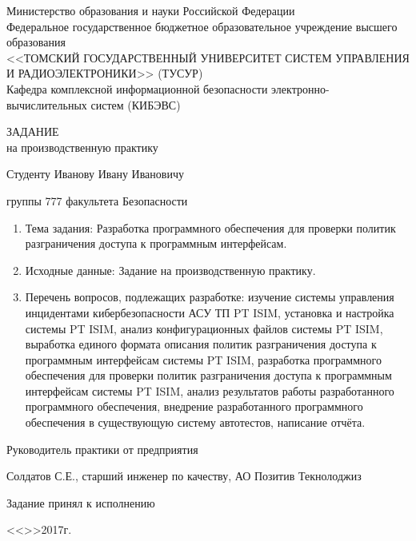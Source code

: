 \begin{center}
 Министерство образования и науки Российской Федерации\\
 Федеральное государственное бюджетное образовательное учреждение высшего образования\\
 <<ТОМСКИЙ ГОСУДАРСТВЕННЫЙ УНИВЕРСИТЕТ СИСТЕМ УПРАВЛЕНИЯ И РАДИОЭЛЕКТРОНИКИ>> (ТУСУР)\\
 Кафедра комплексной информационной безопасности электронно-вычислительных систем (КИБЭВС)\\
\end{center}

\vspace{2em}

\begin{center}
ЗАДАНИЕ\\
на производственную практику
\end{center}

Студенту Иванову Ивану Ивановичу\par
группы 777 факультета Безопасности\par
\begin{enumerate}
    \item Тема задания:
    Разработка программного обеспечения для проверки политик разграничения доступа к программным интерфейсам.
    \item Исходные данные:
    Задание на производственную практику.
    \item Перечень вопросов, подлежащих разработке:
    изучение системы управления инцидентами кибербезопасности АСУ ТП PT ISIM, установка и настройка системы PT ISIM, анализ конфигурационных файлов системы PT ISIM, выработка единого формата описания политик разграничения доступа к программным интерфейсам системы PT ISIM, разработка программного обеспечения для проверки политик разграничения доступа к программным интерфейсам системы PT ISIM, анализ результатов работы разработанного программного обеспечения, внедрение разработанного программного обеспечения в существующую систему автотестов, написание отчёта.
\end{enumerate}

\vspace{2em}


Руководитель практики от предприятия\par
Солдатов С.Е., старший инженер по качеству, АО Позитив Текнолоджиз\underline{\hspace{2cm}}\par
Задание принял к исполнению\underline{\hspace{2cm}}\par
<<\underline{\hspace{1cm}}>>\underline{\hspace{3cm}}2017г.\par
